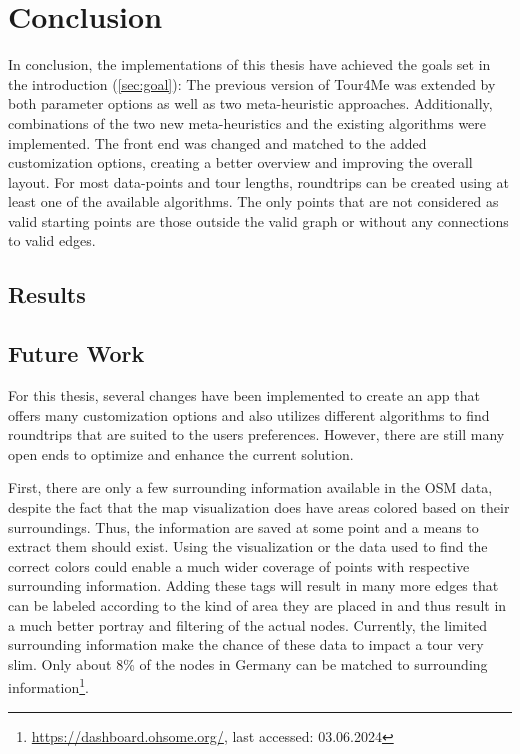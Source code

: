 \chapter{Conclusion}
\label{chapter:conclusion}

In conclusion, the implementations of this thesis have achieved the goals set in the introduction (\ref{sec:goal}):
The previous version of Tour4Me was extended by both parameter options as well as two meta-heuristic approaches. 
Additionally, combinations of the two new meta-heuristics and the existing algorithms were implemented.
The front end was changed and matched to the added customization options, creating a better overview and improving the overall layout.
For most data-points and tour lengths, roundtrips can be created using at least one of the available algorithms. 
The only points that are not considered as valid starting points are those outside the valid graph or without any connections to valid edges.

\section{Results}
\label{sec:results}




\section{Future Work}
\label{sec:futureWork}

For this thesis, several changes have been implemented to create an app that offers many customization options and also utilizes different algorithms to find roundtrips that are suited to the users preferences.
However, there are still many open ends to optimize and enhance the current solution.

First, there are only a few surrounding information available in the OSM data, despite the fact that the map visualization does have areas colored based on their surroundings.
Thus, the information are saved at some point and a means to extract them should exist.
Using the visualization or the data used to find the correct colors could enable a much wider coverage of points with respective surrounding information. 
Adding these tags will result in many more edges that can be labeled according to the kind of area they are placed in and thus result in a much better portray and filtering of the actual nodes.
Currently, the limited surrounding information make the chance of these data to impact a tour very slim.
Only about 8\% of the nodes in Germany can be matched to surrounding information\footnote{\url{https://dashboard.ohsome.org/}, last accessed: 03.06.2024}.

